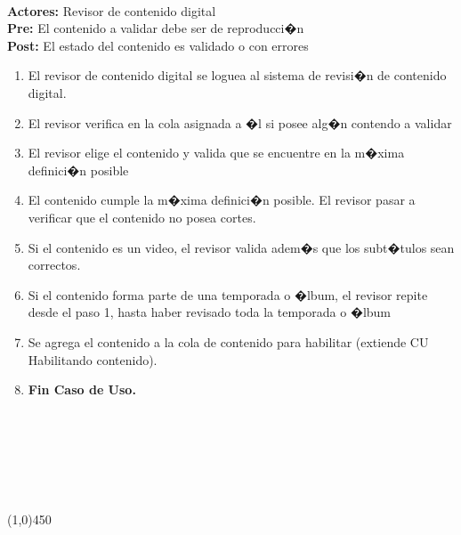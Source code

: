 \documentclass[11pt, a4paper, spanish]{article}
\begin{document}
{ \\ \textbf{Actores:} Revisor de contenido digital \\ \textbf{Pre:} El contenido a validar debe ser de reproducci�n \\ \textbf{Post:} El estado del contenido es validado o con errores\\  \begin{enumerate} \item El revisor de contenido digital se loguea al sistema de revisi�n de contenido digital. \item El revisor verifica en la cola asignada a �l si posee alg�n contendo a validar \item El revisor elige el contenido y valida que se encuentre en la m�xima definici�n posible \item El contenido cumple la m�xima definici�n posible. El revisor pasar a verificar que el contenido no posea cortes. \item Si el contenido es un video, el revisor valida adem�s que los subt�tulos sean correctos. \item Si el contenido forma parte de una temporada o �lbum, el revisor repite desde el paso 1, hasta haber revisado toda la temporada o �lbum \item Se agrega el contenido a la cola de contenido para habilitar (extiende CU Habilitando contenido). \item \textbf{Fin Caso de Uso.} \end{enumerate}  \\  \\  \\  \\  \\ \begin{center} \line(1,0){450} \end{center}

}
\end{document}

